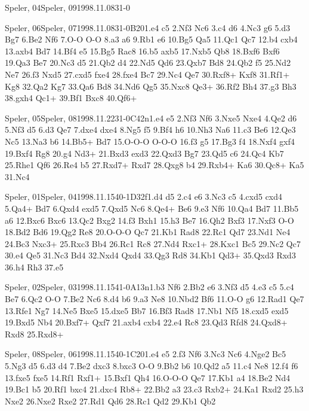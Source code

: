 \documentclass[twocolumn,a4paper,10pt]{report}
\begin{document}
\begin{chessempty}{Speler, 04}{Speler, 09}{1998.11.08}{3}{1-0}{}\end{chessempty}
\begin{chessgame}{Speler, 06}{Speler, 07}{1998.11.08}{3}{1-0}{B20}{1.e4 c5 2.Nf3 Nc6 3.c4 d6 4.Nc3 g6 5.d3 Bg7 6.Be2 Nf6 7.O-O O-O 8.a3 a6 9.Rb1 e6 10.Bg5 Qa5 11.Qc1 Qc7 12.b4 cxb4 13.axb4 Bd7 14.Bf4 e5 15.Bg5 Rac8 16.b5 axb5 17.Nxb5 Qb8 18.Bxf6 Bxf6 19.Qa3 Be7 20.Nc3 d5 21.Qb2 d4 22.Nd5 Qd6 23.Qxb7 Bd8 24.Qb2 f5 25.Nd2 Ne7 26.f3 Nxd5 27.cxd5 fxe4 28.fxe4 Bc7 29.Nc4 Qe7 30.Rxf8+ Kxf8 31.Rf1+ Kg8 32.Qa2 Kg7 33.Qa6 Bd8 34.Nd6 Qg5 35.Nxc8 Qe3+ 36.Rf2 Bh4 37.g3 Bh3 38.gxh4 Qc1+ 39.Bf1 Bxc8 40.Qf6+}\end{chessgame}
\begin{chessgame}{Speler, 05}{Speler, 08}{1998.11.22}{3}{1-0}{C42n}{1.e4 e5 2.Nf3 Nf6 3.Nxe5 Nxe4 4.Qe2 d6 5.Nf3 d5 6.d3 Qe7 7.dxe4 dxe4 8.Ng5 f5 9.Bf4 h6 10.Nh3 Na6 11.c3 Be6 12.Qe3 Nc5 13.Na3 b6 14.Bb5+ Bd7 15.O-O-O O-O-O 16.f3 g5 17.Bg3 f4 18.Nxf4 gxf4 19.Bxf4 Rg8 20.g4 Nd3+ 21.Bxd3 exd3 22.Qxd3 Bg7 23.Qd5 c6 24.Qc4 Kb7 25.Rhe1 Qf6 26.Re4 b5 27.Rxd7+ Rxd7 28.Qxg8 b4 29.Rxb4+ Ka6 30.Qc8+ Ka5 31.Nc4\mate}\end{chessgame}
\begin{chessgame}{Speler, 01}{Speler, 04}{1998.11.15}{4}{0-1}{D32f}{1.d4 d5 2.c4 e6 3.Nc3 c5 4.cxd5 cxd4 5.Qa4+ Bd7 6.Qxd4 exd5 7.Qxd5 Nc6 8.Qe4+ Be6 9.e3 Nf6 10.Qa4 Bd7 11.Bb5 a6 12.Bxc6 Bxc6 13.Qc2 Bxg2 14.f3 Bxh1 15.h3 Be7 16.Qh2 Bxf3 17.Nxf3 O-O 18.Bd2 Bd6 19.Qg2 Re8 20.O-O-O Qc7 21.Kb1 Rad8 22.Rc1 Qd7 23.Nd1 Ne4 24.Bc3 Nxc3+ 25.Rxc3 Bb4 26.Rc1 Rc8 27.Nd4 Rxc1+ 28.Kxc1 Bc5 29.Nc2 Qc7 30.e4 Qe5 31.Nc3 Bd4 32.Nxd4 Qxd4 33.Qg3 Rd8 34.Kb1 Qd3+ 35.Qxd3 Rxd3 36.h4 Rh3 37.e5}\end{chessgame}
\begin{chessgame}{Speler, 02}{Speler, 03}{1998.11.15}{4}{1-0}{A13n}{1.b3 Nf6 2.Bb2 e6 3.Nf3 d5 4.e3 c5 5.c4 Be7 6.Qc2 O-O 7.Be2 Nc6 8.d4 b6 9.a3 Ne8 10.Nbd2 Bf6 11.O-O g6 12.Rad1 Qe7 13.Rfe1 Ng7 14.Ne5 Bxe5 15.dxe5 Bb7 16.Bf3 Rad8 17.Nb1 Nf5 18.cxd5 exd5 19.Bxd5 Nb4 20.Bxf7+ Qxf7 21.axb4 cxb4 22.e4 Rc8 23.Qd3 Rfd8 24.Qxd8+ Rxd8 25.Rxd8+}\end{chessgame}
\begin{chessgame}{Speler, 08}{Speler, 06}{1998.11.15}{4}{0-1}{C20}{1.e4 e5 2.f3 Nf6 3.Nc3 Nc6 4.Nge2 Bc5 5.Ng3 d5 6.d3 d4 7.Be2 dxc3 8.bxc3 O-O 9.Bb2 b6 10.Qd2 a5 11.c4 Ne8 12.f4 f6 13.fxe5 fxe5 14.Rf1 Rxf1+ 15.Bxf1 Qh4 16.O-O-O Qe7 17.Kb1 a4 18.Be2 Nd4 19.Bc1 b5 20.Rf1 bxc4 21.dxc4 Rb8+ 22.Bb2 a3 23.c3 Rxb2+ 24.Ka1 Rxd2 25.h3 Nxe2 26.Nxe2 Rxe2 27.Rd1 Qd6 28.Rc1 Qd2 29.Kb1 Qb2\mate}\end{chessgame}
\end{document}
